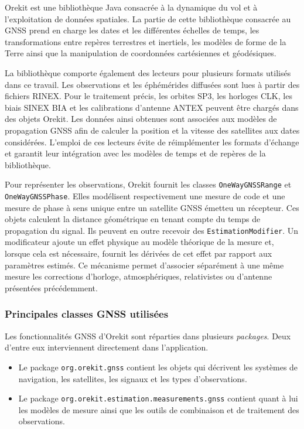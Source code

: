 Orekit est une bibliothèque Java consacrée à la dynamique du vol et à
l'exploitation de données spatiales. La partie de cette bibliothèque consacrée au GNSS
prend en charge les dates et les différentes
échelles de temps, les transformations entre repères terrestres et inertiels,
les modèles de forme de la Terre ainsi que la manipulation de coordonnées
cartésiennes et géodésiques.

La bibliothèque comporte également des lecteurs pour plusieurs formats
utilisés dans ce travail. Les observations et les éphémérides diffusées sont
lues à partir des fichiers RINEX. Pour le traitement précis, les orbites SP3,
les horloges CLK, les biais SINEX BIA et les calibrations d'antenne ANTEX
peuvent être chargés dans des objets Orekit. Les données ainsi obtenues sont
associées aux modèles de propagation GNSS afin de calculer la position et la
vitesse des satellites aux dates considérées. L'emploi de ces lecteurs évite
de réimplémenter les formats d'échange et garantit leur intégration avec les
modèles de temps et de repères de la bibliothèque.

Pour représenter les observations, Orekit fournit les classes
\texttt{OneWayGNSSRange} et \texttt{OneWayGNSSPhase}. Elles modélisent
respectivement une mesure de code et une mesure de phase à sens unique entre
un satellite GNSS émetteu un récepteur. Ces objets calculent la distance géométrique en tenant
compte du temps de propagation du signal. Ils peuvent en outre recevoir des
\texttt{EstimationModifier}. Un modificateur ajoute un effet physique au
modèle théorique de la mesure et, lorsque cela est nécessaire, fournit les
dérivées de cet effet par rapport aux paramètres estimés. Ce mécanisme permet
d'associer séparément à une même mesure les corrections d'horloge,
atmosphériques, relativistes ou d'antenne présentées précédemment.

\subsubsection{Principales classes GNSS utilisées}

Les fonctionnalités GNSS d'Orekit sont réparties dans plusieurs \emph{packages}.
Deux d'entre eux interviennent directement dans l'application.
\begin{itemize}
    \item Le package
\texttt{org.orekit.gnss} contient les objets qui décrivent les systèmes de
navigation, les satellites, les signaux et les types d'observations.

    \item Le package \texttt{org.orekit.estimation.measurements.gnss} contient quant à lui
les modèles de mesure ainsi que les outils de combinaison et de traitement des
observations.
\end{itemize}

